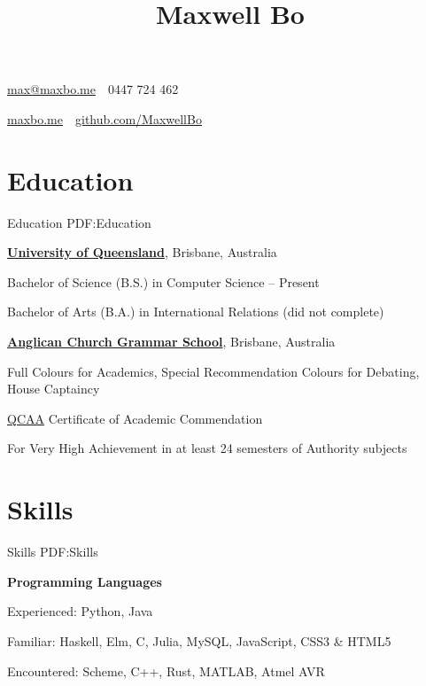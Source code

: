 \documentclass[a4paper,10pt,oneside]{article}
\begin{document}

\title{Maxwell Bo}

\begin{subtitle}
\par \href{mailto:max@maxbo.me}{max@maxbo.me} \,\BulletSymbol\, 0447 724 462

\par \href{http://maxbo.me/}{maxbo.me} \,\BulletSymbol\, \href{https://github.com/MaxwellBo}{github.com/MaxwellBo}

\end{subtitle}

\begin{body}


\section
{Education}
{Education}
{PDF:Education}

\href{https://www.uq.edu.au/}{\textbf{University of Queensland}}, Brisbane, Australia
\par Bachelor of Science (B.S.) in Computer Science \hfill {} -- Present
\par Bachelor of Arts (B.A.) in International Relations (did not complete) \hfill {}

\EntryGap

\href{https://www.churchie.com.au/}{\textbf{Anglican Church Grammar School}}, Brisbane, Australia
\par Full Colours for Academics, Special Recommendation Colours for Debating, House Captaincy \hfill {}
\par \href{https://www.qcaa.qld.edu.au/}{QCAA} Certificate of Academic Commendation \hfill {}
\begin{detail}
For Very High Achievement in at least 24 semesters of Authority subjects
\end{detail}


\section
{Skills}
{Skills}
{PDF:Skills}

\textbf{Programming Languages}
\par Experienced: Python, Java
\par Familiar: Haskell, Elm, C, Julia, MySQL, JavaScript, CSS3 \& HTML5
\par Encountered: Scheme, C++, Rust, MATLAB, Atmel AVR


\end{body}
\end{document}
